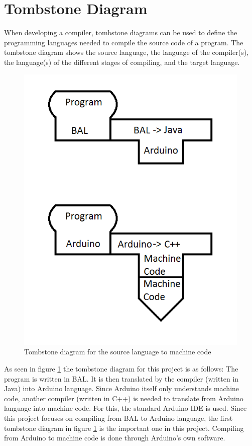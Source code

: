 \pagebreak
\section{Tombstone Diagram}
When developing a compiler, tombstone diagrams can be used to define the programming languages needed to compile the source code of a program. The tombstone diagram shows the source language, the language of the compiler(s), the language(s) of the different stages of compiling, and the target language.

\begin{figure}[H]
	\centering
		\includegraphics{billeder/tombstone_diagram.png}
		\caption{Tombstone diagram for the source language to machine code}
		\label{fig:tombstone}
\end{figure}

As seen in figure \ref{fig:tombstone} the tombstone diagram for this project is as follows: The program is written in BAL. It is then translated by the compiler (written in Java) into Arduino language. Since Arduino itself only understands machine code, another compiler (written in C++) is needed to translate from Arduino language into machine code. For this, the standard Arduino IDE is used.
Since this project focuses on compiling from BAL to Arduino language, the first tombstone diagram in figure \ref{fig:tombstone} is the important one in this project. Compiling from Arduino to machine code is done through Arduino's own software.